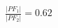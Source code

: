 \documentclass[preview]{standalone}
\begin{document}
\begin{align*}
\frac{|PF_1|}{|PF_2|} = 0.62
\end{align*}
\end{document}
